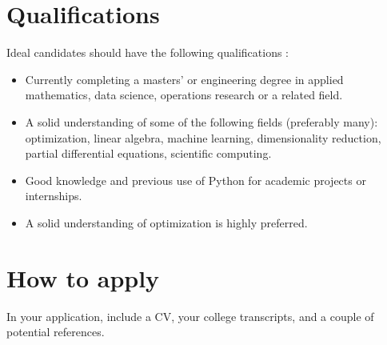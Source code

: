 \documentclass[12pt]{article}
\begin{document}
	
	\section{Qualifications}
	Ideal candidates should have the following qualifications :
	\begin{itemize}
		\item Currently completing a masters' or engineering degree in applied mathematics, data science, operations research or a related field.
		\item A solid understanding of some of the following fields (preferably many): optimization, linear algebra, machine learning, dimensionality reduction, partial differential equations, scientific computing.
		\item Good knowledge and previous use of Python for academic projects or internships.
		\item A solid understanding of optimization is highly preferred.
	\end{itemize}
	\section{How to apply}
	In your application, include a CV, your college transcripts, and a couple of potential references.%
	
	
\end{document}
